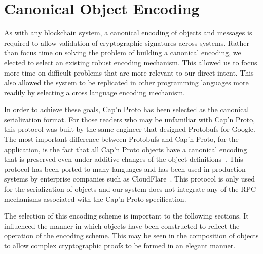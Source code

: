 \section{Canonical Object Encoding}

As with any blockchain system, a canonical encoding of objects and
messages is required to allow validation of cryptographic signatures
across systems.
Rather than focus time on solving the problem of building a canonical
encoding, we elected to select an existing robust encoding mechanism.
This allowed us to focus more time on difficult problems that are more
relevant to our direct intent.
This also allowed the system to be replicated in other programming
languages more readily by selecting a cross language encoding mechanism.

In order to achieve these goals, Cap'n Proto has been selected as the
canonical serialization format.
For those readers who may be unfamiliar with Cap'n Proto, this protocol
was built by the same engineer that designed Protobufs for Google.
The most important difference between Protobufs and Cap'n Proto, for
the \LayerTwoLong{} application, is the fact that all Cap'n Proto objects
have a canonical encoding that is preserved even under additive changes
of the object definitions~\cite{CapnProto}.
This protocol has been ported to many languages and has been used in
production systems by enterprise companies such as
CloudFlare~\cite{CapnProtoNews}.
This protocol is only used for the serialization of objects and our
system does not integrate any of the RPC mechanisms associated with the
Cap'n Proto specification.

The selection of this encoding scheme is important to the following
sections.
It influenced the manner in which objects have been constructed to
reflect the operation of the encoding scheme.
This may be seen in the composition of objects to allow complex
cryptographic proofs to be formed in an elegant manner.
